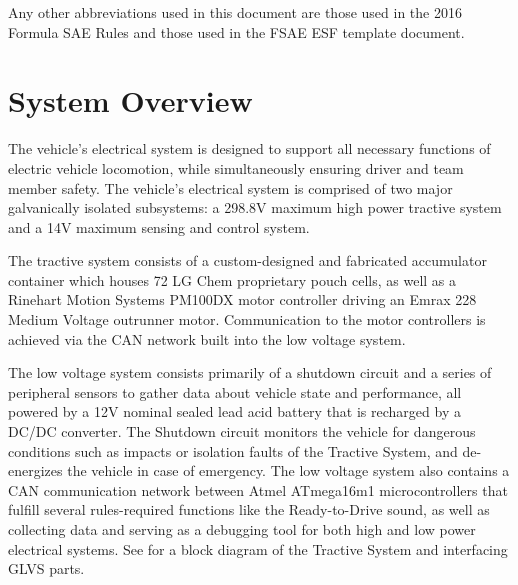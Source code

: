 \documentclass{article}
\begin{document}
    Any other abbreviations used in this document are those used in the 2016 Formula SAE Rules and those used in the FSAE ESF template document.

\setlength{\parindent}{0pt}

\newpage
{}
\section{System Overview}\label{system_overview}
The vehicle's electrical system is designed to support all necessary functions of electric vehicle locomotion, while simultaneously ensuring driver and team member safety. The vehicle's electrical system is comprised of two major galvanically isolated subsystems: a 298.8V maximum high power tractive system and a 14V maximum sensing and control system. 
\medskip

 The tractive system consists of a custom-designed and fabricated accumulator container which houses 72 LG Chem proprietary pouch cells, as well as a Rinehart Motion Systems PM100DX motor controller driving an Emrax 228 Medium Voltage outrunner motor. Communication to the motor controllers is achieved via the CAN network built into the low voltage system. \newline

The low voltage system consists primarily of a shutdown circuit and a series of peripheral sensors to gather data about vehicle state and performance, all powered by a 12V nominal sealed lead acid battery that is recharged by a DC/DC converter. The Shutdown circuit monitors the vehicle for dangerous conditions such as impacts or isolation faults of the Tractive System, and de-energizes the vehicle in case of emergency. The low voltage system also contains a CAN communication network between Atmel ATmega16m1 microcontrollers that fulfill several rules-required functions like the Ready-to-Drive sound, as well as collecting data and serving as a debugging tool for both high and low power electrical systems. \newline
See  for a block diagram of the Tractive System and interfacing GLVS parts.

\end{document}
